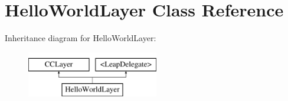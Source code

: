 \hypertarget{interface_hello_world_layer}{\section{Hello\-World\-Layer Class Reference}
\label{dd/d46/interface_hello_world_layer}
}
Inheritance diagram for Hello\-World\-Layer\-:\begin{figure}[H]
\begin{center}
\leavevmode
\includegraphics[height=2.000000cm]{dd/d46/interface_hello_world_layer}
\end{center}
\end{figure}
